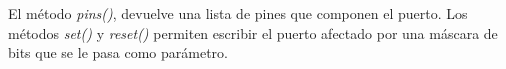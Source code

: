 El método \emph{pins()}, devuelve una lista de pines que componen el puerto. Los métodos \emph{set()} y \emph{reset()} permiten escribir el puerto afectado por una máscara de bits que se le pasa como parámetro.







